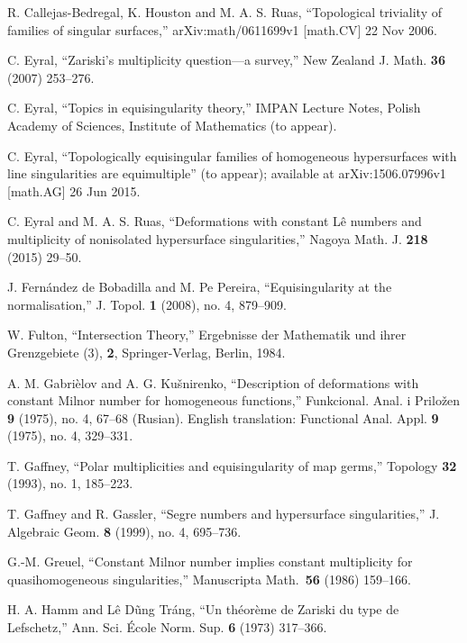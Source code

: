 \documentclass[a4paper,fleqn,11pt]{amsart}
\theoremstyle{definition}
\theoremstyle{remark}
\numberwithin{equation}{section}
\begin{document}

\begin{thebibliography}{10}

 R. Callejas-Bedregal, K. Houston and M. A. S. Ruas, ``Topological triviality of families of singular surfaces,''  arXiv:math/0611699v1 [math.CV] 22 Nov 2006.

 C. Eyral, ``Zariski's multiplicity question---a survey,'' New Zealand J. Math. \textbf{36} (2007) 253--276.

 C. Eyral, ``Topics in equisingularity theory,'' IMPAN Lecture Notes, Polish Academy of Sciences, Institute of Mathematics (to appear).

 C. Eyral, ``Topologically equisingular families of homogeneous hypersurfaces with line singularities are equimultiple'' (to appear); available at arXiv:1506.07996v1 [math.AG] 26 Jun 2015.

 C. Eyral and M. A. S. Ruas, ``Deformations with constant L\^e numbers and multiplicity of nonisolated hypersurface singularities,''  Nagoya Math. J. \textbf{218} (2015) 29--50.

 J. Fern\'andez de Bobadilla and M. Pe Pereira, ``Equisingularity at the normalisation,'' J. Topol. \textbf{1} (2008), no. 4, 879--909. 

 W. Fulton, ``Intersection Theory,'' Ergebnisse der Mathematik und ihrer Grenzgebiete (3), \textbf{2}, Springer-Verlag, Berlin, 1984.

 A. M. Gabri\`elov and A. G. Ku\v{s}nirenko, ``Description of deformations with constant Milnor number for homogeneous functions,'' Funkcional. Anal. i Prilo\v{z}en \textbf{9} (1975), no. 4, 67--68 (Rusian). English translation: Functional Anal. Appl. \textbf{9} (1975), no. 4, 329--331.

 T. Gaffney, ``Polar multiplicities and equisingularity of map germs,'' Topology \textbf{32} (1993), no. 1, 185--223.

 T. Gaffney and R. Gassler, ``Segre numbers and hypersurface singularities,'' J. Algebraic Geom. \textbf{8} (1999), no. 4, 695--736.

 G.-M. Greuel, ``Constant Milnor number implies
constant multiplicity for quasihomogeneous singularities,''
Manuscripta Math.~\textbf{56} (1986) 159--166.

 H. A. Hamm and L\^e D\~ung Tr\'ang, ``Un th\'eor\`eme de Zariski
du type de Lefschetz,'' Ann. Sci. \'Ecole Norm. Sup. \textbf{6} (1973)
317--366. 


\end{thebibliography}
\end{document}
